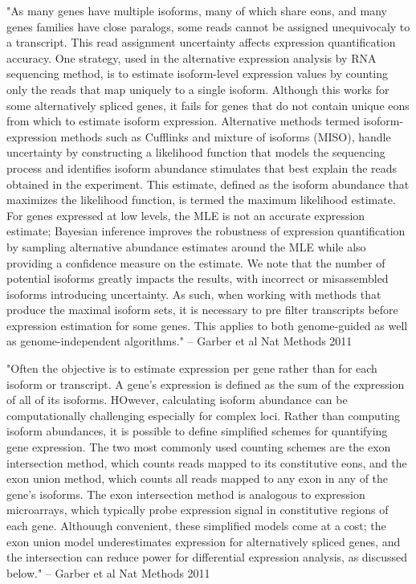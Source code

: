 \documentclass[10pt]{article}
\begin{document}
"As many genes have multiple isoforms, many of which share eons, and many genes families have close paralogs, some reads cannot be assigned unequivocaly to a transcript.  This read assignment uncertainty affects expression quantification accuracy.  One strategy, used in the alternative expression analysis by RNA sequencing method, is to estimate isoform-level expression values by counting only the reads that map uniquely to a single isoform.  Although this works for some alternatively spliced genes, it fails for genes that do not contain unique eons from which to estimate isoform expression.  Alternative methods termed isoform-expression methods such as Cufflinks and mixture of isoforms (MISO), handle uncertainty by constructing a likelihood function that models the sequencing process and identifies isoform abundance stimulates that best explain the reads obtained in the experiment.  This estimate, defined as the isoform abundance that maximizes the likelihood function, is termed the maximum likelihood estimate.  For genes expressed at low levels, the MLE is not an accurate expression estimate; Bayesian inference improves the robustness of expression quantification by sampling alternative abundance estimates around the MLE while also providing a confidence measure on the estimate.  We note that the number of potential isoforms greatly impacts the results, with incorrect or misassembled isoforms introducing uncertainty.  As such, when working with methods that produce the maximal isoform sets, it is necessary to pre filter transcripts before expression estimation for some genes.  This applies to both genome-guided as well as genome-independent algorithms."  -- Garber et al Nat Methods 2011

"Often the objective is to estimate expression per gene rather than for each isoform or transcript.  A gene's expression is defined as the sum of the expression of all of its isoforms.  HOwever, calculating isoform abundance can be computationally challenging especially for complex loci.  Rather than computing isoform abundances, it is possible to define simplified schemes for quantifying gene expression.  The two most commonly used counting schemes are the exon intersection method, which counts reads mapped to its constitutive eons, and the exon union method, which counts all reads mapped to any exon in any of the gene's isoforms.  The exon intersection method is analogous to expression microarrays, which typically probe expression signal in constitutive regions of each gene.  Althouugh convenient, these simplified models come at a cost; the exon union model underestimates expression for alternatively spliced genes, and the intersection can reduce power for differential expression analysis, as discussed below."  -- Garber et al Nat Methods 2011
\end{document}
